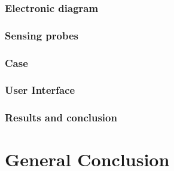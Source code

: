 \documentclass[conference]{IEEEtran}
\begin{document}
      \subsubsection{Electronic diagram}
      \subsubsection{Sensing probes}
      \subsubsection{Case}
      \subsubsection{User Interface}
      \subsubsection{Results and conclusion}
\section{General Conclusion} %







\end{document}
